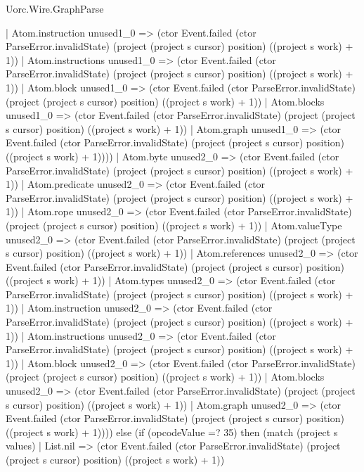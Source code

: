 \begin{lexlean}{Uorc.Wire.GraphParse}
\begin{semanticmodule}
{              | Atom.instruction unused1_0 => (ctor Event.failed (ctor ParseError.invalidState) (project (project s cursor) position) ((project s work) + 1))
              | Atom.instructions unused1_0 => (ctor Event.failed (ctor ParseError.invalidState) (project (project s cursor) position) ((project s work) + 1))
              | Atom.block unused1_0 => (ctor Event.failed (ctor ParseError.invalidState) (project (project s cursor) position) ((project s work) + 1))
              | Atom.blocks unused1_0 => (ctor Event.failed (ctor ParseError.invalidState) (project (project s cursor) position) ((project s work) + 1))
              | Atom.graph unused1_0 => (ctor Event.failed (ctor ParseError.invalidState) (project (project s cursor) position) ((project s work) + 1))))
          | Atom.byte unused2_0 => (ctor Event.failed (ctor ParseError.invalidState) (project (project s cursor) position) ((project s work) + 1))
          | Atom.predicate unused2_0 => (ctor Event.failed (ctor ParseError.invalidState) (project (project s cursor) position) ((project s work) + 1))
          | Atom.rope unused2_0 => (ctor Event.failed (ctor ParseError.invalidState) (project (project s cursor) position) ((project s work) + 1))
          | Atom.valueType unused2_0 => (ctor Event.failed (ctor ParseError.invalidState) (project (project s cursor) position) ((project s work) + 1))
          | Atom.references unused2_0 => (ctor Event.failed (ctor ParseError.invalidState) (project (project s cursor) position) ((project s work) + 1))
          | Atom.types unused2_0 => (ctor Event.failed (ctor ParseError.invalidState) (project (project s cursor) position) ((project s work) + 1))
          | Atom.instruction unused2_0 => (ctor Event.failed (ctor ParseError.invalidState) (project (project s cursor) position) ((project s work) + 1))
          | Atom.instructions unused2_0 => (ctor Event.failed (ctor ParseError.invalidState) (project (project s cursor) position) ((project s work) + 1))
          | Atom.block unused2_0 => (ctor Event.failed (ctor ParseError.invalidState) (project (project s cursor) position) ((project s work) + 1))
          | Atom.blocks unused2_0 => (ctor Event.failed (ctor ParseError.invalidState) (project (project s cursor) position) ((project s work) + 1))
          | Atom.graph unused2_0 => (ctor Event.failed (ctor ParseError.invalidState) (project (project s cursor) position) ((project s work) + 1)))) else (if (opcodeValue =? 35) then (match (project s values)
        | List.nil => (ctor Event.failed (ctor ParseError.invalidState) (project (project s cursor) position) ((project s work) + 1))
}
\end{semanticmodule}
\end{lexlean}
